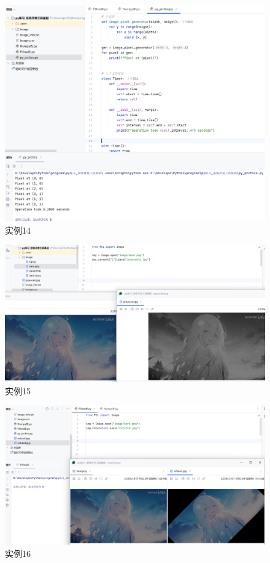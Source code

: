 \documentclass[cn,12pt]{report}
\begin{document}
{    \begin{figure}[htbp]
    \centering
    \includegraphics[width=1\textwidth]{image/10.png}
    \caption{实例14}
  \end{figure}
\FloatBarrier
   
    \begin{figure}[htbp]
    \centering
    \includegraphics[width=1\textwidth]{image/14.png}
    \caption{实例15}
  \end{figure}
\FloatBarrier
   
      \begin{figure}[htbp]
    \centering
    \includegraphics[width=1\textwidth]{image/15.png}
    \caption{实例16}
  \end{figure}
\FloatBarrier
   
}
\end{document}
